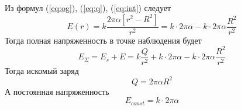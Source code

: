\documentclass[a5paper,10pt]{article}
\begin{document}
Из формул (\ref{eq:og}), (\ref{eq:q}), (\ref{eq:int}) следует
\begin{equation}
	E(r)=k\frac{2\pi\alpha \left[r^2-R^2\right]}{r^2}=
	k\cdot2\pi\alpha-
	k\cdot2\pi\alpha\frac{R^2}{r^2}
\end{equation}
Тогда полная напряженность в точке наблюдения будет
\begin{equation}
	E_\Sigma=E_s+E=
	k\frac{Q}{r^2}+
	k\cdot2\pi\alpha-
	k\cdot2\pi\alpha\frac{R^2}{r^2}
\end{equation}
Тогда искомый заряд 	
\begin{equation}
	Q=2\pi\alpha R^2
\end{equation}
А постоянная напряженность
\begin{equation}
	E_{const}=k\cdot2\pi\alpha
\end{equation}
\end{document}
